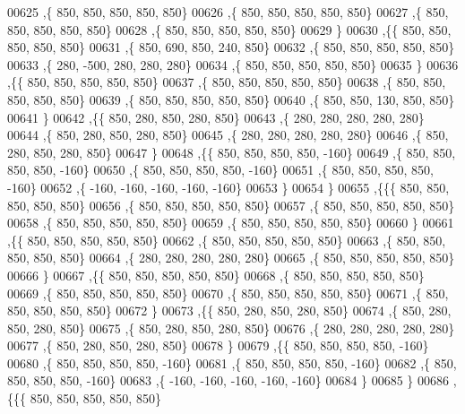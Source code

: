 \begin{DoxyCode}
00625    ,\{   850,   850,   850,   850,   850\}
00626    ,\{   850,   850,   850,   850,   850\}
00627    ,\{   850,   850,   850,   850,   850\}
00628    ,\{   850,   850,   850,   850,   850\}
00629    \}
00630   ,\{\{   850,   850,   850,   850,   850\}
00631    ,\{   850,   690,   850,   240,   850\}
00632    ,\{   850,   850,   850,   850,   850\}
00633    ,\{   280,  -500,   280,   280,   280\}
00634    ,\{   850,   850,   850,   850,   850\}
00635    \}
00636   ,\{\{   850,   850,   850,   850,   850\}
00637    ,\{   850,   850,   850,   850,   850\}
00638    ,\{   850,   850,   850,   850,   850\}
00639    ,\{   850,   850,   850,   850,   850\}
00640    ,\{   850,   850,   130,   850,   850\}
00641    \}
00642   ,\{\{   850,   280,   850,   280,   850\}
00643    ,\{   280,   280,   280,   280,   280\}
00644    ,\{   850,   280,   850,   280,   850\}
00645    ,\{   280,   280,   280,   280,   280\}
00646    ,\{   850,   280,   850,   280,   850\}
00647    \}
00648   ,\{\{   850,   850,   850,   850,  -160\}
00649    ,\{   850,   850,   850,   850,  -160\}
00650    ,\{   850,   850,   850,   850,  -160\}
00651    ,\{   850,   850,   850,   850,  -160\}
00652    ,\{  -160,  -160,  -160,  -160,  -160\}
00653    \}
00654   \}
00655  ,\{\{\{   850,   850,   850,   850,   850\}
00656    ,\{   850,   850,   850,   850,   850\}
00657    ,\{   850,   850,   850,   850,   850\}
00658    ,\{   850,   850,   850,   850,   850\}
00659    ,\{   850,   850,   850,   850,   850\}
00660    \}
00661   ,\{\{   850,   850,   850,   850,   850\}
00662    ,\{   850,   850,   850,   850,   850\}
00663    ,\{   850,   850,   850,   850,   850\}
00664    ,\{   280,   280,   280,   280,   280\}
00665    ,\{   850,   850,   850,   850,   850\}
00666    \}
00667   ,\{\{   850,   850,   850,   850,   850\}
00668    ,\{   850,   850,   850,   850,   850\}
00669    ,\{   850,   850,   850,   850,   850\}
00670    ,\{   850,   850,   850,   850,   850\}
00671    ,\{   850,   850,   850,   850,   850\}
00672    \}
00673   ,\{\{   850,   280,   850,   280,   850\}
00674    ,\{   850,   280,   850,   280,   850\}
00675    ,\{   850,   280,   850,   280,   850\}
00676    ,\{   280,   280,   280,   280,   280\}
00677    ,\{   850,   280,   850,   280,   850\}
00678    \}
00679   ,\{\{   850,   850,   850,   850,  -160\}
00680    ,\{   850,   850,   850,   850,  -160\}
00681    ,\{   850,   850,   850,   850,  -160\}
00682    ,\{   850,   850,   850,   850,  -160\}
00683    ,\{  -160,  -160,  -160,  -160,  -160\}
00684    \}
00685   \}
00686  ,\{\{\{   850,   850,   850,   850,   850\}

\end{DoxyCode}
